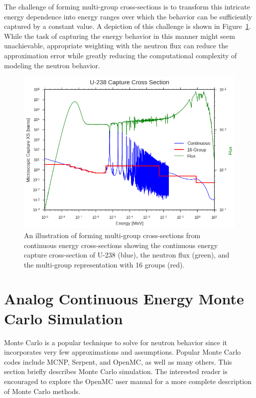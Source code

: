 The challenge of forming multi-group cross-sections is to transform this intricate energy dependence into energy ranges over which the behavior can be sufficiently captured by a constant value. A depiction of this challenge is shown in Figure~\ref{fig:microscopic-to-multigroup}. While the task of capturing the energy behavior in this manner might seem unachievable, appropriate weighting with the neutron flux can reduce the approximation error while greatly reducing the computational complexity of modeling the neutron behavior.
\begin{figure}[h!]
	\centering
	\includegraphics[width=0.9\linewidth]{figures/u238-capture-16.png}
	\caption[]{An illustration of forming multi-group cross-sections from continuous energy cross-sections showing the continuous energy capture cross-section of U-238 (blue), the neutron flux (green), and the multi-group representation with 16 groups (red).}
	\label{fig:microscopic-to-multigroup}
\end{figure}

\section{Analog Continuous Energy Monte Carlo Simulation}
\label{sec:monte-carlo}

Monte Carlo is a popular technique to solve for neutron behavior since it incorporates very few approximations and assumptions. Popular Monte Carlo codes include MCNP\cite{mcnpx2003manual}, Serpent\cite{leppanen2007serpent}, and OpenMC\cite{romano2013openmc}, as well as many others. This section briefly describes Monte Carlo simulation. The interested reader is encouraged to explore the OpenMC user manual\cite{openmc2016manual} for a more complete description of Monte Carlo methods.

